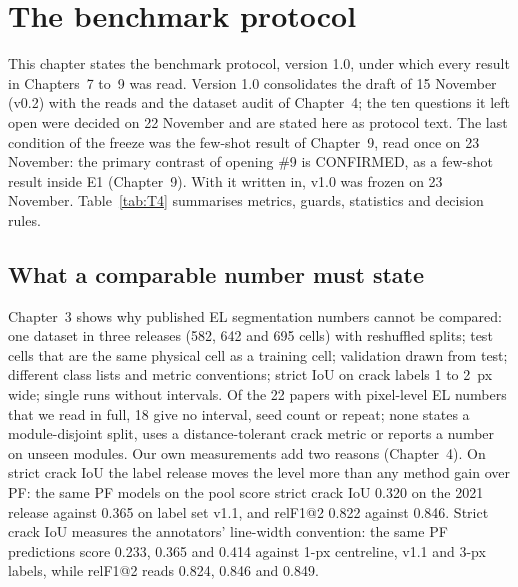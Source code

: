
\chapter{The benchmark protocol}
\label{ch:protocol}

This chapter states the benchmark protocol, version 1.0, under which every result in Chapters~7 to~9 was read. Version 1.0
consolidates the draft of 15 November (v0.2) with the reads and the dataset audit of Chapter~4; the ten questions it left open were
decided on 22 November and are stated here as protocol text. The last condition of the freeze was the few-shot result of Chapter~9,
read once on 23 November: the primary contrast of opening \#9 is CONFIRMED, as a few-shot result inside E1 (Chapter~9). With it
written in, v1.0 was frozen on 23 November. Table~\ref{tab:T4} summarises metrics, guards, statistics and decision rules.


\section{What a comparable number must state}
\label{sec:protocol-design}

Chapter~3 shows why published EL segmentation numbers cannot be compared: one dataset in three releases (582, 642 and 695 cells) with
reshuffled splits; test cells that are the same physical cell as a training cell; validation drawn from test; different class lists
and metric conventions; strict IoU on crack labels 1 to 2~px wide; single runs without intervals. Of the 22 papers with pixel-level EL
numbers that we read in full, 18 give no interval, seed count or repeat; none states a module-disjoint split, uses a distance-tolerant
crack metric or reports a number on unseen modules. Our own measurements add two reasons (Chapter~4). On strict crack IoU the label release moves the level
more than any method gain over PF: the same PF models on the pool score strict crack IoU 0.320 on the 2021 release against 0.365 on label set
v1.1, and relF1@2 0.822 against 0.846. Strict crack IoU measures the annotators' line-width convention: the same PF predictions score
0.233, 0.365 and 0.414 against 1-px centreline, v1.1 and 3-px labels, while relF1@2 reads 0.824, 0.846 and 0.849.

